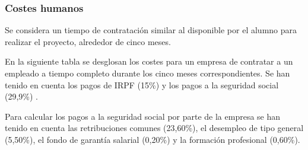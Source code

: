 \subsubsection{Costes humanos}

Se considera un tiempo de contratación similar al disponible por el alumno para realizar el proyecto, alrededor de cinco meses.

En la siguiente tabla se desglosan los costes para un empresa de contratar a un empleado a tiempo completo durante los cinco meses correspondientes. Se han tenido en cuenta los pagos de IRPF (15\%) \cite{pago:irpf} y los pagos a la seguridad social (29,9\%) \cite{pago:ss}.

Para calcular los pagos a la seguridad social por parte de la empresa se han tenido en cuenta las retribuciones comunes (23,60\%), el desempleo de tipo general (5,50\%), el fondo de garantía salarial (0,20\%) y la formación profesional (0,60\%).

